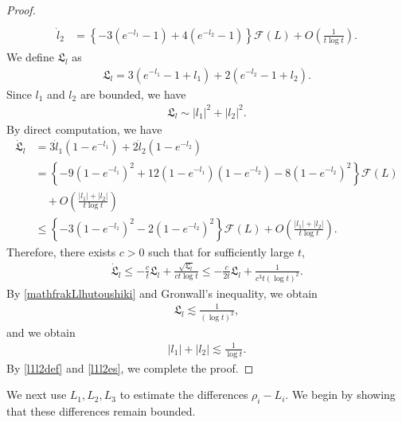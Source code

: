 \documentclass[reqno]{amsart}
\theoremstyle{plain}
\theoremstyle{definition}
\numberwithin{equation}{section}
\begin{document}
\begin{proof}
\begin{align}
\begin{aligned}
\\
\dot{l}_2&=\left\{-3\left(e^{-l_1}-1\right)+4\left(e^{-l_2}-1\right)\right\}\mathcal{F}(L)+O\left(\frac{1}{t\log{t}}\right).
\end{aligned}
\end{align}
We define $\mathfrak{L}_l$ as 
\begin{align}\label{mathfrakLdef}
\mathfrak{L}_l=3\left(e^{-l_1}-1+l_1\right)+2\left(e^{-l_2}-1+l_2\right).
\end{align}
Since $l_1$ and $l_2$ are bounded, we have
\begin{align}\label{mathfrakLsim}
\mathfrak{L}_l\sim |l_1|^2+|l_2|^2.
\end{align}
By direct computation, we have
\begin{align*}
\dot{\mathfrak{L}}_l&=3\dot{l}_1\left(1-e^{-l_1}\right)+2\dot{l}_2\left(1-e^{-l_2}\right)
\\
&=\left\{-9\left(1-e^{-l_1}\right)^2+12\left(1-e^{-l_1}\right)\left(1-e^{-l_2}\right)-8\left(1-e^{-l_2}\right)^2\right\}\mathcal{F}(L)
\\
&\quad+O\left(\frac{|l_1|+|l_2|}{t\log{t}}\right)
\\
&\leq \left\{ -3\left(1-e^{-l_1}\right)^2-2\left(1-e^{-l_2}\right)^2\right\}\mathcal{F}(L)+O\left(\frac{|l_1|+|l_2|}{t\log{t}}\right).
\end{align*}
Therefore, there exists $c>0$ such that for sufficiently large $t$,
\begin{align}\label{mathfrakLlhutoushiki}
\dot{\mathfrak{L}}_l\leq-\frac{c}{t}\mathfrak{L}_l+\frac{\sqrt{\mathfrak{L}_l}}{ct\log{t}}\leq -\frac{c}{2t}\mathfrak{L}_l+\frac{1}{c^3t(\log{t})^2}.
\end{align}
By \eqref{mathfrakLlhutoushiki} and Gronwall's inequality, we obtain
\begin{align*}
\mathfrak{L}_l\lesssim \frac{1}{(\log{t})^2},
\end{align*}
and we obtain 
\begin{align}\label{l1l2es}
|l_1|+|l_2|\lesssim \frac{1}{\log{t}}.
\end{align}
By \eqref{l1l2def} and \eqref{l1l2es}, we complete the proof.
\end{proof}


We next use $L_1,L_2,L_3$ to estimate the differences $\rho_i-L_i$. We begin by showing that these differences remain bounded.
\end{document}
